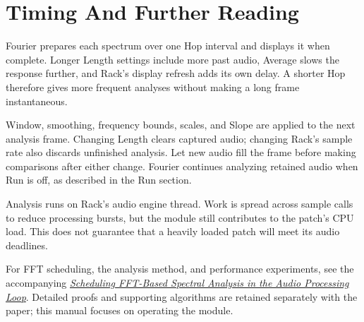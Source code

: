 \section{Timing And Further Reading}\label{sec:further-reading}

Fourier prepares each spectrum over one Hop interval and displays it when
complete. Longer Length settings include more past audio, Average slows the
response further, and Rack's display refresh adds its own delay. A shorter
Hop therefore gives more frequent analyses without making a long frame
instantaneous.

Window, smoothing, frequency bounds, scales, and Slope are applied to the
next analysis frame. Changing Length clears captured audio; changing Rack's sample rate
also discards unfinished analysis. Let new audio fill the frame before making
comparisons after either change. Fourier continues analyzing retained audio
when Run is off, as described in the Run section.

Analysis runs on Rack's audio engine thread. Work is spread across sample
calls to reduce processing bursts, but the module still contributes to the
patch's CPU load. This does not guarantee that a heavily loaded patch will
meet its audio deadlines.

For FFT scheduling, the analysis method, and performance experiments, see
the accompanying
\href{https://github.com/Kautenja/ArhythmeticUnits-Fourier/tree/main/docs/whitepaper}{\textit{Scheduling FFT-Based Spectral Analysis in the Audio Processing Loop}}.
Detailed proofs and supporting algorithms are retained separately with the
paper; this manual focuses on operating the module.
